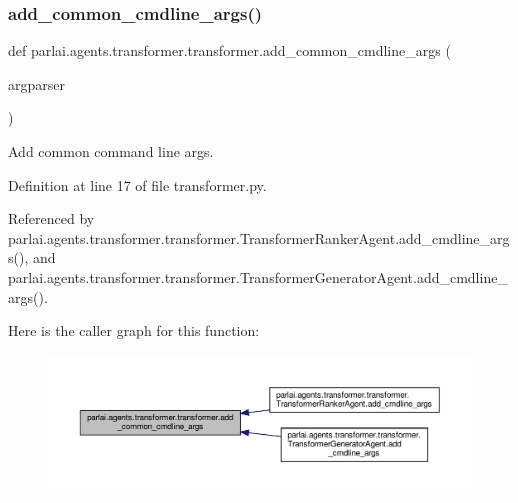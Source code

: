 \subsubsection{\texorpdfstring{add\+\_\+common\+\_\+cmdline\+\_\+args()}{add\_common\_cmdline\_args()}}
{\footnotesize\ttfamily def parlai.\+agents.\+transformer.\+transformer.\+add\+\_\+common\+\_\+cmdline\+\_\+args (\begin{DoxyParamCaption}\item[{}]{argparser }\end{DoxyParamCaption})}

\begin{DoxyVerb}Add common command line args.\end{DoxyVerb}
 

Definition at line 17 of file transformer.\+py.



Referenced by parlai.\+agents.\+transformer.\+transformer.\+Transformer\+Ranker\+Agent.\+add\+\_\+cmdline\+\_\+args(), and parlai.\+agents.\+transformer.\+transformer.\+Transformer\+Generator\+Agent.\+add\+\_\+cmdline\+\_\+args().

Here is the caller graph for this function\+:
\nopagebreak
\begin{figure}[H]
\begin{center}
\leavevmode
\includegraphics[width=350pt]{namespaceparlai_1_1agents_1_1transformer_1_1transformer_a916bc49d43dc0e244d24c47956c621ca_icgraph}
\end{center}
\end{figure}
